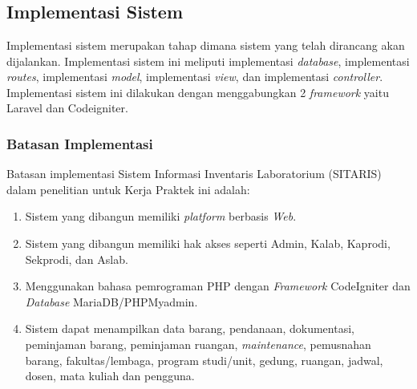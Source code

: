 %
%
%
%

\chapter{\babLima}

\section{Implementasi Sistem}
Implementasi sistem merupakan tahap dimana sistem yang telah dirancang akan dijalankan. Implementasi sistem ini meliputi implementasi \textit{database}, implementasi \textit{routes}, implementasi \textit{model}, implementasi \textit{view}, dan implementasi \textit{controller}. Implementasi sistem ini dilakukan dengan menggabungkan 2 \textit{framework} yaitu Laravel dan Codeigniter.

\subsection{Batasan Implementasi}
Batasan implementasi Sistem Informasi Inventaris Laboratorium (SITARIS) dalam penelitian untuk Kerja Praktek ini adalah:
\begin{enumerate}
	\item Sistem yang dibangun memiliki \textit{platform} berbasis\textit{ Web}.
	\item Sistem yang dibangun memiliki hak akses seperti Admin, Kalab, Kaprodi, Sekprodi, dan Aslab.
	\item Menggunakan bahasa pemrograman PHP dengan \textit{Framework} CodeIgniter dan \textit{Database} MariaDB/PHPMyadmin.
	\item Sistem dapat menampilkan data barang, pendanaan, dokumentasi, peminjaman barang, peminjaman ruangan, \textit{maintenance}, pemusnahan barang, fakultas/lembaga, program studi/unit, gedung, ruangan, jadwal, dosen, mata kuliah dan pengguna.
\end{enumerate}

